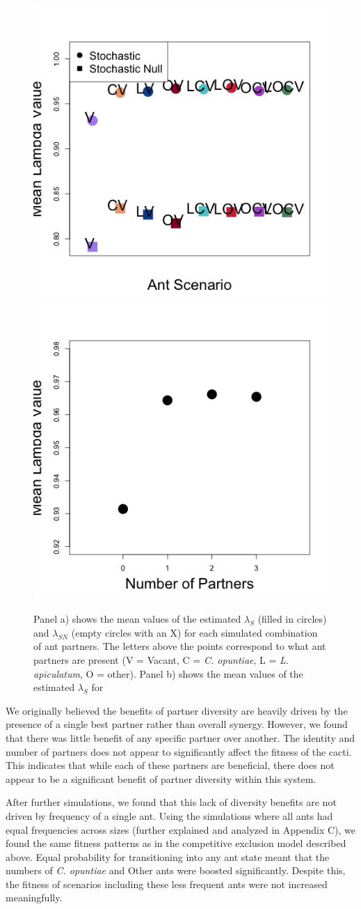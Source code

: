 \documentclass[11pt]{article}
\begin{document}
\begin{figure}
	\includegraphics[width=0.61\linewidth]{Figures/comp_outputmeans_s_sn.png}
	\includegraphics[width=0.39\linewidth]{Figures/comp_num_partners_s.png}
	\caption{Panel a) shows the mean values of the estimated $\lambda_{S}$ (filled in circles) and $\lambda_{SN}$ (empty circles with an X) for each simulated combination of ant partners. The letters above the points correspond to what ant partners are present (V = Vacant, C = \textit{C. opuntiae}, L = \textit{L. apiculatum}, O = other). Panel b) shows the mean values of the estimated $\lambda_{S}$ for }
	\label{fig:LambdaMeans}
\end{figure}

We originally believed the benefits of partner diversity are heavily driven by the presence of a single best partner rather than overall synergy.
However, we found that there was little benefit of any specific partner over another.
The identity and number of partners does not appear to significantly affect the fitness of the cacti. 
This indicates that while each of these partners are beneficial, there does not appear to be a significant benefit of partner diversity within this system. 

After further simulations, we found that this lack of diversity benefits are not driven by frequency of a single ant. 
Using the simulations where all ants had equal frequencies across sizes (further explained and analyzed in Appendix C), we found the same fitness patterns as in the competitive exclusion model described above.
Equal probability for transitioning into any ant state meant that the numbers of \textit{C. opuntiae} and Other ants were boosted significantly.
Despite this, the fitness of scenarios including these less frequent ants were not increased meaningfully.
\end{document}

